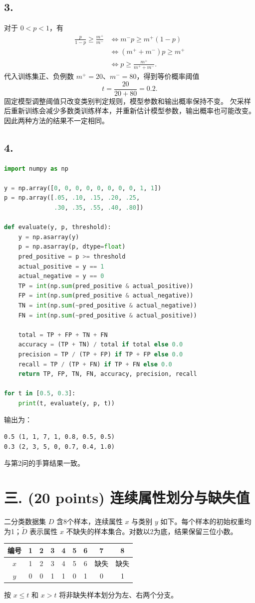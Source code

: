 \documentclass[10pt]{article}
\begin{document}
\subsection*{3.}
对于 $0<p<1$，有
\begin{align*}
\frac{p}{1-p}\geq\frac{m^+}{m^-}
&\iff m^-p\geq m^+(1-p)\\
&\iff (m^++m^-)p\geq m^+\\
&\iff p\geq\frac{m^+}{m^++m^-}.
\end{align*}
代入训练集正、负例数 $m^+=20$、$m^-=80$，得到等价概率阈值
\[
{t=\frac{20}{20+80}=0.2}.
\]
固定模型调整阈值只改变类别判定规则，模型参数和输出概率保持不变。
欠采样后重新训练会减少多数类训练样本，并重新估计模型参数，输出概率也可能改变。
因此两种方法的结果不一定相同。

\subsection*{4.}
\begin{lstlisting}[language=Python,caption=二分类计数与评价指标的完整实现]
import numpy as np

y = np.array([0, 0, 0, 0, 0, 0, 0, 0, 1, 1])
p = np.array([.05, .10, .15, .20, .25,
              .30, .35, .55, .40, .80])

def evaluate(y, p, threshold):
    y = np.asarray(y)
    p = np.asarray(p, dtype=float)
    pred_positive = p >= threshold
    actual_positive = y == 1
    actual_negative = y == 0
    TP = int(np.sum(pred_positive & actual_positive))
    FP = int(np.sum(pred_positive & actual_negative))
    TN = int(np.sum(~pred_positive & actual_negative))
    FN = int(np.sum(~pred_positive & actual_positive))

    total = TP + FP + TN + FN
    accuracy = (TP + TN) / total if total else 0.0
    precision = TP / (TP + FP) if TP + FP else 0.0
    recall = TP / (TP + FN) if TP + FN else 0.0
    return TP, FP, TN, FN, accuracy, precision, recall

for t in [0.5, 0.3]:
    print(t, evaluate(y, p, t))
\end{lstlisting}
输出为：
\begin{lstlisting}
0.5 (1, 1, 7, 1, 0.8, 0.5, 0.5)
0.3 (2, 3, 5, 0, 0.7, 0.4, 1.0)
\end{lstlisting}
与第2问的手算结果一致。


\newpage
\section*{三. (20 points) 连续属性划分与缺失值}
二分类数据集 $D$ 含8个样本，连续属性 $x$ 与类别 $y$ 如下。每个样本的初始权重均为1；$\tilde D$ 表示属性 $x$ 不缺失的样本集合。对数以2为底，结果保留三位小数。
\begin{center}
\begin{tabular}{c*{8}{c}}
\toprule
编号 & 1 & 2 & 3 & 4 & 5 & 6 & 7 & 8 \\
\midrule
$x$ & 1 & 2 & 3 & 4 & 5 & 6 & 缺失 & 缺失 \\
$y$ & 0 & 0 & 1 & 1 & 0 & 1 & 0 & 1 \\
\bottomrule
\end{tabular}
\end{center}
按 $x\leq t$ 和 $x>t$ 将非缺失样本划分为左、右两个分支。
\end{document}
